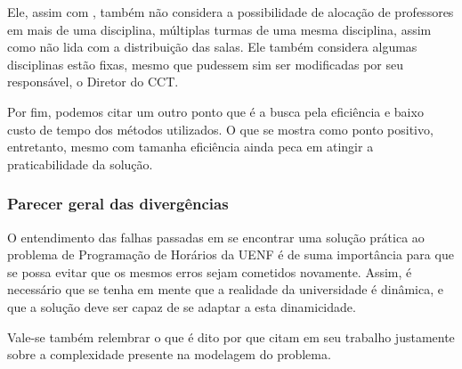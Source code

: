 Ele, assim com , também não considera a possibilidade de alocação de professores em mais de uma disciplina, múltiplas turmas de uma mesma disciplina, assim como não lida com a distribuição das salas. Ele também considera algumas disciplinas estão fixas, mesmo que pudessem sim ser modificadas por seu responsável, o Diretor do CCT.

Por fim, podemos citar um outro ponto que é a busca pela eficiência e baixo custo de tempo dos métodos utilizados. O que se mostra como ponto positivo, entretanto, mesmo com tamanha eficiência ainda peca em atingir a praticabilidade da solução.

\subsubsection{Parecer geral das divergências}

O entendimento das falhas passadas em se encontrar uma solução prática ao problema de Programação de Horários da UENF é de suma importância para que se possa evitar que os mesmos erros sejam cometidos novamente. Assim, é necessário que se tenha em mente que a realidade da universidade é dinâmica, e que a solução deve ser capaz de se adaptar a esta dinamicidade.

Vale-se também relembrar o que é dito por  que citam em seu trabalho justamente sobre a complexidade presente na modelagem do problema.

